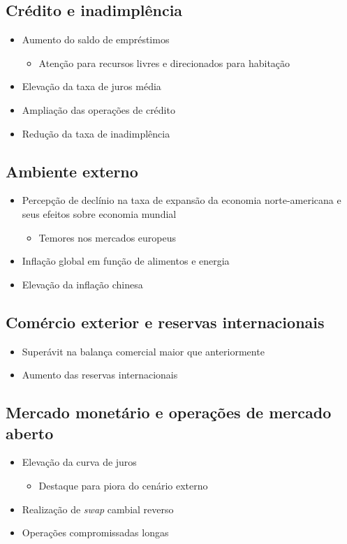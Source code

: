\documentclass[11pt]{article}
\begin{document}
\subsection*{Crédito e inadimplência}
\label{sec:org64ae0b2}
\begin{itemize}
\item Aumento do saldo de empréstimos
\begin{itemize}
\item Atenção para recursos livres e direcionados para habitação
\end{itemize}
\item Elevação da taxa de juros média
\item Ampliação das operações de crédito
\item Redução da taxa de inadimplência
\end{itemize}
\subsection*{Ambiente externo}
\label{sec:orgdc0e6de}
\begin{itemize}
\item Percepção de declínio na taxa de expansão da economia norte-americana  e seus efeitos sobre economia mundial
\begin{itemize}
\item Temores nos mercados europeus
\end{itemize}
\item Inflação global em função de alimentos e energia
\item Elevação da inflação chinesa
\end{itemize}
\subsection*{Comércio exterior e reservas internacionais}
\label{sec:org548d4c2}
\begin{itemize}
\item Superávit na balança comercial maior que anteriormente
\item Aumento das reservas internacionais
\end{itemize}
\subsection*{Mercado monetário e operações de mercado aberto}
\label{sec:orge2d1e4e}
\begin{itemize}
\item Elevação da curva de juros
\begin{itemize}
\item Destaque para piora do cenário externo
\end{itemize}
\item Realização de \emph{swap} cambial reverso
\item Operações compromissadas longas
\end{itemize}
\end{document}
